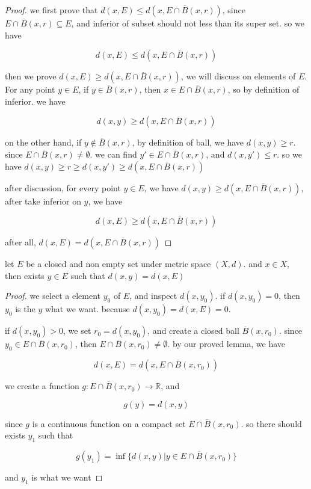 \documentclass[11pt,a4paper]{article}
\begin{document}
\begin{proof}
    we first prove that $d(x, E) \le d(x, E \cap \overline{B}(x,r))$, since $E \cap \overline{B}(x,r) \subseteq E$, and
    inferior of subset should not less than its super set. so we have

    \[
        d(x, E) \le d(x, E \cap \overline{B}(x,r))
    \]

    then we prove $d(x, E) \ge d(x, E \cap \overline{B}(x,r))$, we will discuss on elements of $E$. For any point $y \in E$,
    if $y \in \overline{B}(x,r)$, then $x \in E \cap \overline{B}(x,r)$, so by definition of inferior. we have

    \[
        d(x, y) \ge d(x, E \cap \overline{B}(x,r))
    \]

    on the other hand, if $y \notin \overline{B}(x,r)$, by definition of ball, we have $d(x,y) \ge r$. since
    $E \cap \overline{B}(x,r) \ne \emptyset$. we can find $y' \in E \cap \overline{B}(x,r) $, and $d(x,y') \le r$.
    so we have $d(x,y) \ge r \ge d(x,y') \ge d(x, E \cap \overline{B}(x,r))$

    after discussion, for every point $y \in E$, we have $d(x,y) \ge d(x, E \cap \overline{B}(x,r))$, after take inferior on $y$, we have

    \[
        d(x,E) \ge d(x, E \cap \overline{B}(x,r))
    \]

    after all, $d(x,E) = d(x, E \cap \overline{B}(x,r))$
\end{proof}

\begin{lem}
    let $E$ be a closed and non empty set under metric space $(X,d)$. and $x \in X$, then exists $y \in E$ such that 
    $d(x,y) = d(x, E)$
\end{lem}

\begin{proof}
   we select a element $y_0$ of $E$, and inspect $d(x,y_0)$. if $d(x,y_0) = 0$, then $y_0$ is the $y$ what we want. because
   $d(x,y_0) = d(x, E) = 0$. 
   
   if $d(x, y_0) > 0$, we set $r_0 = d(x,y_0)$, and create a closed ball $\overline{B}(x,r_0)$. since
   $y_0 \in E \cap \overline{B}(x, r_0)$, then $E \cap \overline{B}(x, r_0) \ne \emptyset$. by our proved lemma, we have

   \[
    d(x, E) = d(x, E \cap \overline{B}(x, r_0))
   \]

   we create a function $g: E \cap \overline{B}(x, r_0) \to \mathbb{R}$, and

   \[
    g(y) = d(x, y)
   \]

   since $g$ is a continuous function on a compact set $E \cap \overline{B}(x, r_0)$. so there
   should exists $y_1$ such that

   \[
    g(y_1) = \inf \{ d(x,y) \vert y \in E \cap \overline{B}(x, r_0)\}
   \]

   and $y_1$ is what we want
\end{proof}
\end{document}
